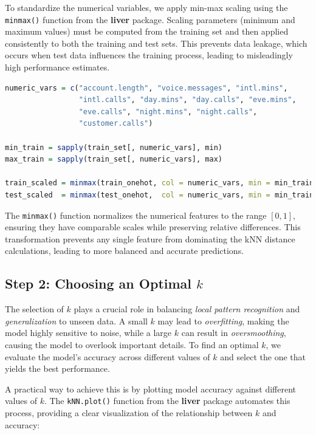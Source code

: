 \documentclass[
  11pt,
]{book}
\newcommand{\passthrough}[1]{#1}
\theoremstyle{definition}
\theoremstyle{definition}
\theoremstyle{definition}
\theoremstyle{definition}
\theoremstyle{remark}
\begin{document}
To standardize the numerical variables, we apply min-max scaling using the \passthrough{\lstinline!minmax()!} function from the \textbf{liver} package. Scaling parameters (minimum and maximum values) must be computed from the training set and then applied consistently to both the training and test sets. This prevents data leakage, which occurs when test data influences the training process, leading to misleadingly high performance estimates.

\begin{lstlisting}[language=R]
numeric_vars = c("account.length", "voice.messages", "intl.mins", 
                 "intl.calls", "day.mins", "day.calls", "eve.mins", 
                 "eve.calls", "night.mins", "night.calls", 
                 "customer.calls")

min_train = sapply(train_set[, numeric_vars], min)
max_train = sapply(train_set[, numeric_vars], max)

train_scaled = minmax(train_onehot, col = numeric_vars, min = min_train, max = max_train)
test_scaled  = minmax(test_onehot,  col = numeric_vars, min = min_train, max = max_train)
\end{lstlisting}

The \passthrough{\lstinline!minmax()!} function normalizes the numerical features to the range \([0, 1]\), ensuring they have comparable scales while preserving relative differences. This transformation prevents any single feature from dominating the kNN distance calculations, leading to more balanced and accurate predictions.

\subsection{\texorpdfstring{Step 2: Choosing an Optimal \(k\)}{Step 2: Choosing an Optimal k}}\label{step-2-choosing-an-optimal-k}

The selection of \(k\) plays a crucial role in balancing \emph{local pattern recognition} and \emph{generalization} to unseen data. A small \(k\) may lead to \emph{overfitting}, making the model highly sensitive to noise, while a large \(k\) can result in \emph{oversmoothing}, causing the model to overlook important details. To find an optimal \(k\), we evaluate the model's accuracy across different values of \(k\) and select the one that yields the best performance.

A practical way to achieve this is by plotting model accuracy against different values of \(k\). The \passthrough{\lstinline!kNN.plot()!} function from the \textbf{liver} package automates this process, providing a clear visualization of the relationship between \(k\) and accuracy:
\end{document}
